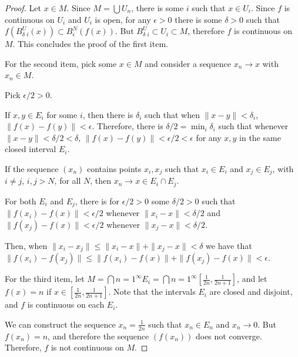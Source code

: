 \begin{proof}
Let $x\in M$. Since $M = \bigcup U_n$, there is some $i$ such that $x \in U_i$. Since $f$ is continuous on $U_i$ and $U_i$ is open, for any $\epsilon>0$ there is some $\delta >0$ such that $f(B_\delta^U_i(x)) \subset B_\epsilon^N(f(x))$.
But $B_\delta^U_i \subset U_i \subset M$, therefore $f$ is continuous on $M$. This concludes the proof of the first item.

\vspace{1em}

For the second item, pick some $x \in M$ and consider a sequence $x_n \rightarrow x$ with $x_n \in M$.

Pick $\epsilon/2 > 0$.

If $x,y \in E_i$ for some $i$, then there is $\delta_i$ such that when $\|x - y\| < \delta_i$, $\|f(x) - f(y)\| < \epsilon$. Therefore, there is $\delta/2 = \min_i \delta_i$ such that whenever $\|x - y\| < \delta/2 < \delta$, $\|f(x) - f(y)\| < \epsilon/2 < \epsilon$ for any $x,y$ in the same closed interval $E_i$.

If the sequence $(x_n)$ contains points $x_i, x_j$ such that $x_i \in E_i$ and $x_j \in E_j$, with $i \neq j$, $i,j>N$, for all $N$, then $x_n \rightarrow x \in E_i \cap E_j$.

For both $E_i$ and $E_j$, there is for $\epsilon/2 > 0$ some $\delta/2 > 0$ such that
$\|f(x_i) - f(x)\| < \epsilon/2$ whenever $\|x_i - x\| < \delta/2$ and $\|f(x_j) - f(x)\| < \epsilon/2$ whenever $\|x_j - x\| < \delta/2$.

Then, when $\|x_i - x_j\| \leq \|x_i - x\| + \|x_j - x\| < \delta$ we have that $\|f(x_i) - f(x_j)\| \leq \|f(x_i) - f(x)\| + \|f(x_j) - f(x)\| < \epsilon$.


\vspace{1em}

For the third item, let $M = \bigcap{n=1}^\infty E_i = \bigcap{n=1}^\infty [\frac{1}{2n}, \frac{1}{2n+1}]$, and let $f(x) = n$ if $x \in [\frac{1}{2n}, \frac{1}{2n+1}]$. Note that the intervals $E_i$ are closed and disjoint, and $f$ is continuous on each $E_i$.

We can construct the sequence $x_n = \frac{1}{2n}$ such that $x_n \in E_n$ and $x_n \rightarrow 0$. But $f(x_n) = n$, and therefore the sequence $(f(x_n))$ does not converge. Therefore, $f$ is not continuous on $M$.

\end{proof}


